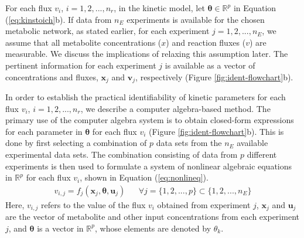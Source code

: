 \documentclass[10pt]{article}
\begin{document}
	For each flux $v_i$, $i={1, 2, ..., n_r}$, in the kinetic model, let $\mathbf{\theta} \in \mathbb{R}^p$ in Equation (\ref{eq:kinstoich}b). If data from $n_E$ experiments is available for the chosen metabolic network, as stated earlier, for each experiment $j = {1, 2, ..., n_E}$, we assume that all metabolite concentrations ($x$) and reaction fluxes ($v$) are measurable. We discuss the implications of relaxing this assumption later. The pertinent information for each experiment $j$ is available as a vector of concentrations and fluxes, $\mathbf{x}_j$ and $\mathbf{v}_j$, respectively (Figure \ref{fig:ident-flowchart}b). 
	
	In order to establish the practical identifiability of kinetic parameters for each flux $v_i$, $i={1, 2, ..., n_r}$, we describe a computer algebra-based method. The primary use of the computer algebra system is to obtain closed-form expressions for each parameter in $\mathbf{\theta}$ for each flux $v_i$ (Figure \ref{fig:ident-flowchart}b). This is done by first selecting a combination of $p$ data sets from the $n_{E}$ available experimental data sets. The combination consisting of data from $p$ different experiments is then used to formulate a system of nonlinear algebraic equations in $\mathbb{R}^p$ for each flux $v_i$, shown in Equation (\ref{eq:nonlineq}). 
	\begin{align}\label{eq:nonlineq}
	v_{i, j} = f_j(\mathbf{x}_j,\mathbf{\theta}, \mathbf{u}_j) && \forall j=\{1, 2, ..., p\}\subset\{1, 2, ..., n_E\}
	\end{align}
	Here, $v_{i,j}$ refers to the value of the flux $v_i$ obtained from experiment $j$, $\mathbf{x}_j$ and $\mathbf{u}_j$ are the vector of metabolite and other input concentrations from each experiment $j$, and $\mathbf{\theta}$ is a vector in $\mathbb{R}^p$, whose elements are denoted by $\theta_k$.
	
\end{document}

